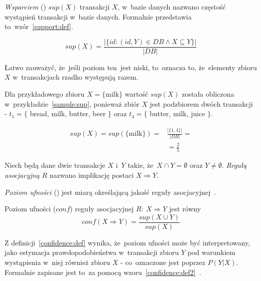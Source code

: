\emph{Wsparciem} () $sup(X)$ transakcji $X$, w~bazie danych nazwano częstość wystąpień transakcji w~bazie danych. Formalnie przedstawia to~wzór~\ref{support:def}.

\begin{equation}
\label{support:def}
sup(X)=\frac{| \lbrace id: (id,Y)\in DB \wedge X\subseteq Y \rbrace |}{|DB|}
\end{equation}

Łatwo zauważyć, że~jeśli poziom ten~jest niski, to~oznacza to, że~elementy zbioru $X$ w~transakcjach rzadko występują razem.

Dla przykładowego zbioru $X=\lbrace \textrm{milk} \rbrace$ wartość $sup(X)$ została obliczona w~przykładzie~\ref{sample:sup}, ponieważ zbiór $X$ jest podzbiorem dwóch transakcji - $t_1 = \lbrace$ bread, milk, butter, beer $\rbrace$ oraz $t_4 = \lbrace$ butter, milk, juice $\rbrace$.

\begin{equation}\label{sample:sup}
\begin{split}
sup(X)= sup(\lbrace \textrm{milk} \rbrace) =& \frac{|\lbrace 1, 4 \rbrace|}{|DB|} =\\
 &= \frac{2}{5}
\end{split}
\end{equation}

\begin{df}\label{regula:def}
Niech będą dane dwie transakcje $X$ i~$Y$ takie, że~$X\cap Y=\emptyset$ oraz $Y \neq \emptyset$. \emph{Regułą asocjacyjną} $R$ nazwano implikację postaci $X\Rightarrow  Y$.
\end{df}

\emph{Poziom ufności} () jest miarą określającą jakość reguły asocjacyjnej~\cite{Elmasri:db}. 

\begin{df}\label{confidence:def}
Poziom ufności ($conf$) reguły asocjacyjnej $R:\ X \Rightarrow Y$ jest równy 
\begin{equation}
	conf(X \Rightarrow Y) = \frac{sup(X \cup Y)}{sup(X)}
\end{equation}
\end{df}

Z definicji~\ref{confidence:def} wynika, że~poziom ufności może być interpretowany, jako estymacja prawdopodobieństwa w~transakcji zbioru $Y$ pod warunkiem wystąpienia w~niej również zbioru $X$ - co~oznaczone jest poprzez $P(Y | X)$. Formalnie zapisane jest to~za pomocą wzoru~\ref{confidence:def2}~\cite{ParallelAlgorithms}.

